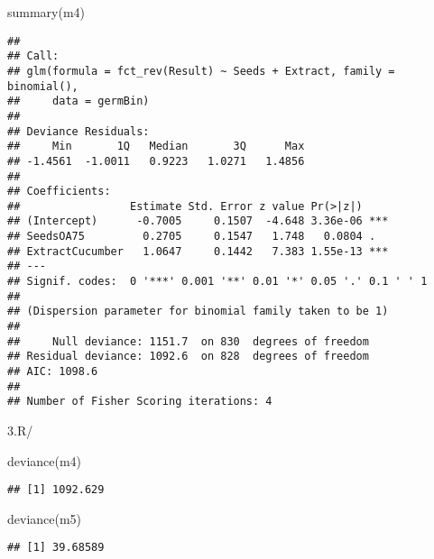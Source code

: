 \documentclass[
]{article}
\newenvironment{Shaded}{\begin{snugshade}}{\end{snugshade}}
\newcommand{\DecValTok}[1]{\textcolor[rgb]{0.00,0.00,0.81}{#1}}
\newcommand{\FunctionTok}[1]{\textcolor[rgb]{0.00,0.00,0.00}{#1}}
\newcommand{\NormalTok}[1]{#1}
\newcommand{\SpecialCharTok}[1]{\textcolor[rgb]{0.00,0.00,0.00}{#1}}
\begin{document}
\begin{Shaded}
\begin{Highlighting}[]
\FunctionTok{summary}\NormalTok{(m4)}
\end{Highlighting}
\end{Shaded}

\begin{verbatim}
## 
## Call:
## glm(formula = fct_rev(Result) ~ Seeds + Extract, family = binomial(), 
##     data = germBin)
## 
## Deviance Residuals: 
##     Min       1Q   Median       3Q      Max  
## -1.4561  -1.0011   0.9223   1.0271   1.4856  
## 
## Coefficients:
##                 Estimate Std. Error z value Pr(>|z|)    
## (Intercept)      -0.7005     0.1507  -4.648 3.36e-06 ***
## SeedsOA75         0.2705     0.1547   1.748   0.0804 .  
## ExtractCucumber   1.0647     0.1442   7.383 1.55e-13 ***
## ---
## Signif. codes:  0 '***' 0.001 '**' 0.01 '*' 0.05 '.' 0.1 ' ' 1
## 
## (Dispersion parameter for binomial family taken to be 1)
## 
##     Null deviance: 1151.7  on 830  degrees of freedom
## Residual deviance: 1092.6  on 828  degrees of freedom
## AIC: 1098.6
## 
## Number of Fisher Scoring iterations: 4
\end{verbatim}

3.R/

\begin{Shaded}
\begin{Highlighting}[]
\FunctionTok{deviance}\NormalTok{(m4)}
\end{Highlighting}
\end{Shaded}

\begin{verbatim}
## [1] 1092.629
\end{verbatim}

\begin{Shaded}
\begin{Highlighting}[]
\FunctionTok{deviance}\NormalTok{(m5)}
\end{Highlighting}
\end{Shaded}

\begin{verbatim}
## [1] 39.68589
\end{verbatim}

\begin{Shaded}
\end{Shaded}
\end{document}
